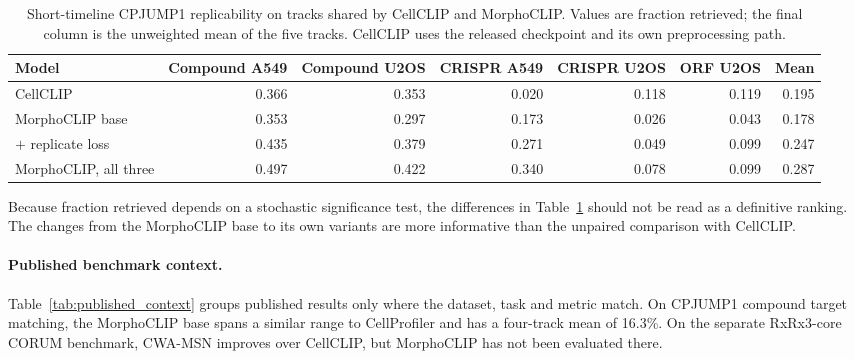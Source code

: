 \begin{table}[t]
  \centering
  \caption{Short-timeline CPJUMP1 replicability on tracks shared by CellCLIP and MorphoCLIP.
    Values are fraction retrieved; the final column is the unweighted mean of the five tracks.
    CellCLIP uses the released checkpoint and its own preprocessing path.}
  \label{tab:same_harness}
  \begin{tabular}{@{}lrrrrrr@{}}
    \toprule
    Model & Compound A549 & Compound U2OS & CRISPR A549 & CRISPR U2OS & ORF U2OS & Mean \\
    \midrule
    CellCLIP~\cite{lu2025cellclip}
    & 0.366 & 0.353 & 0.020 & 0.118 & 0.119 & 0.195 \\
    MorphoCLIP base
    & 0.353 & 0.297 & 0.173 & 0.026 & 0.043 & 0.178 \\
    $+$ replicate loss
    & 0.435 & 0.379 & 0.271 & 0.049 & 0.099 & 0.247 \\
    MorphoCLIP, all three
    & 0.497 & 0.422 & 0.340 & 0.078 & 0.099 & 0.287 \\
    \bottomrule
  \end{tabular}
\end{table}

Because fraction retrieved depends on a stochastic significance test, the differences in
Table~\ref{tab:same_harness} should not be read as a definitive ranking. The changes from the
MorphoCLIP base to its own variants are more informative than the unpaired comparison with
CellCLIP.

\paragraph{Published benchmark context.}
Table~\ref{tab:published_context} groups published results only where the dataset, task and metric
match. On CPJUMP1 compound target matching, the MorphoCLIP base spans a similar range to
CellProfiler and has a four-track mean of 16.3\%. On the separate RxRx3-core CORUM benchmark,
CWA-MSN improves over CellCLIP, but MorphoCLIP has not been evaluated there.

